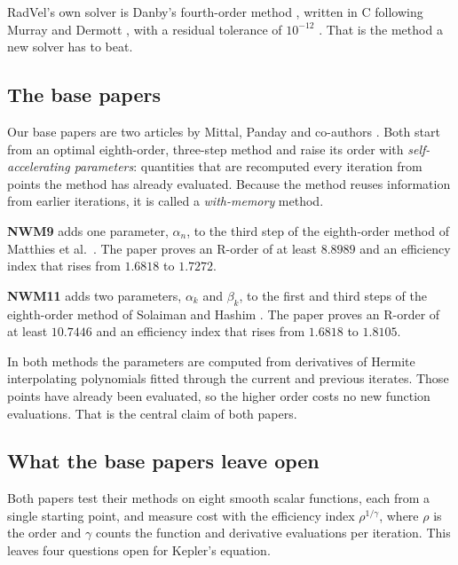 \documentclass[sigconf,nonacm]{acmart}
\begin{document}
RadVel's own solver is Danby's fourth-order method \cite{danby}, written in
C following Murray and Dermott \cite{murray}, with a residual tolerance of
$10^{-12}$ \cite{radvelsrc}. That is the method a new solver has to beat.

\subsection{The base papers}
\label{sec:base}

Our base papers are two articles by Mittal, Panday and co-authors
\cite{nwm9,nwm11}. Both start from an optimal eighth-order, three-step
method and raise its order with \emph{self-accelerating parameters}:
quantities that are recomputed every iteration from points the method has
already evaluated. Because the method reuses information from earlier
iterations, it is called a \emph{with-memory} method.

\textbf{NWM9} \cite{nwm9} adds one parameter, $\alpha_n$, to the third
step of the eighth-order method of Matthies et al.\ \cite{matthies}. The
paper proves an R-order of at least $8.8989$ and an efficiency index that rises from
$1.6818$ to $1.7272$.

\textbf{NWM11} \cite{nwm11} adds two parameters, $\alpha_k$ and $\beta_k$,
to the first and third steps of the eighth-order method of Solaiman and
Hashim \cite{solaiman}. The paper proves an R-order of at least $10.7446$
and an efficiency index that rises from $1.6818$ to $1.8105$.

In both methods the parameters are computed from derivatives of Hermite
interpolating polynomials fitted through the current and previous iterates. Those points
have already been evaluated, so the higher order costs no new function
evaluations. That is the central claim of both papers.

\subsection{What the base papers leave open}

Both papers test their methods on eight smooth scalar functions, each from
a single starting point, and measure cost with the efficiency index
$\rho^{1/\gamma}$, where $\rho$ is the order and $\gamma$ counts the
function and derivative evaluations per iteration. This leaves four questions open for Kepler's equation.
\end{document}
